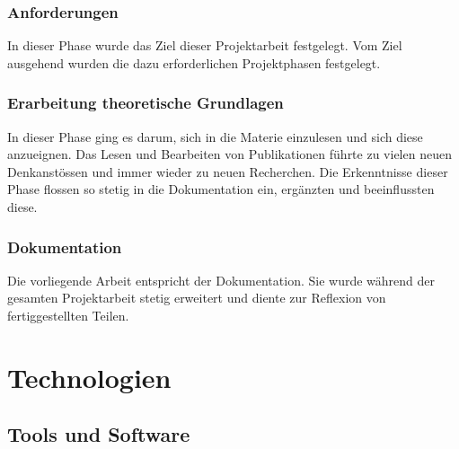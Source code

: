 \subsubsection{Anforderungen}
\label{ssubsec:requirements}

In dieser Phase wurde das Ziel dieser Projektarbeit festgelegt. Vom Ziel
ausgehend wurden die dazu erforderlichen Projektphasen festgelegt.

\subsubsection{Erarbeitung theoretische Grundlagen}
\label{ssubsec:theoretical_background}

In dieser Phase ging es darum, sich in die Materie einzulesen und sich
diese anzueignen. Das Lesen und Bearbeiten von Publikationen führte zu
vielen neuen Denkanstössen und immer wieder zu neuen Recherchen. Die
Erkenntnisse dieser Phase flossen so stetig in die Dokumentation ein,
ergänzten und beeinflussten diese.

\subsubsection{Dokumentation}
\label{ssubsec:documentation}

Die vorliegende Arbeit entspricht der Dokumentation. Sie wurde während
der gesamten Projektarbeit stetig erweitert und diente zur Reflexion von
fertiggestellten Teilen.

\section{Technologien}
\label{sec:technologies}

\subsection{Tools und Software}
\label{subsec:tools_software}

